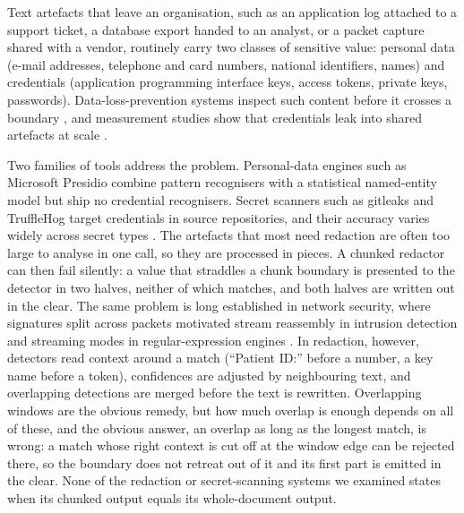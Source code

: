 \documentclass[pdflatex,sn-mathphys-num]{sn-jnl}
\theoremstyle{\ssThmStyle}
\theoremstyle{\ssDefStyle}
\begin{document}
Text artefacts that leave an organisation, such as an application log attached to a support ticket, a database export handed to an analyst, or a packet capture shared with a vendor, routinely carry two classes of sensitive value: personal data (e-mail addresses, telephone and card numbers, national identifiers, names) and credentials (application programming interface keys, access tokens, private keys, passwords). Data-loss-prevention systems inspect such content before it crosses a boundary \cite{alneyadi2016dlp,manmadhan2014behavioural,manmadhan2014email}, and measurement studies show that credentials leak into shared artefacts at scale \cite{meli2019git,krause2023pushed}.

Two families of tools address the problem. Personal-data engines such as Microsoft Presidio \cite{presidio} combine pattern recognisers with a statistical named-entity model but ship no credential recognisers. Secret scanners such as gitleaks \cite{gitleaks} and TruffleHog \cite{trufflehog} target credentials in source repositories, and their accuracy varies widely across secret types \cite{basak2023comparative}. The artefacts that most need redaction are often too large to analyse in one call, so they are processed in pieces. A chunked redactor can then fail silently: a value that straddles a chunk boundary is presented to the detector in two halves, neither of which matches, and both halves are written out in the clear. The same problem is long established in network security, where signatures split across packets motivated stream reassembly in intrusion detection \cite{ptacek1998insertion} and streaming modes in regular-expression engines \cite{wang2019hyperscan,intel2019hyperscanintro}. In redaction, however, detectors read context around a match (``Patient ID:'' before a number, a key name before a token), confidences are adjusted by neighbouring text, and overlapping detections are merged before the text is rewritten. Overlapping windows are the obvious remedy, but how much overlap is enough depends on all of these, and the obvious answer, an overlap as long as the longest match, is wrong: a match whose right context is cut off at the window edge can be rejected there, so the boundary does not retreat out of it and its first part is emitted in the clear. None of the redaction or secret-scanning systems we examined states when its chunked output equals its whole-document output.
\end{document}
